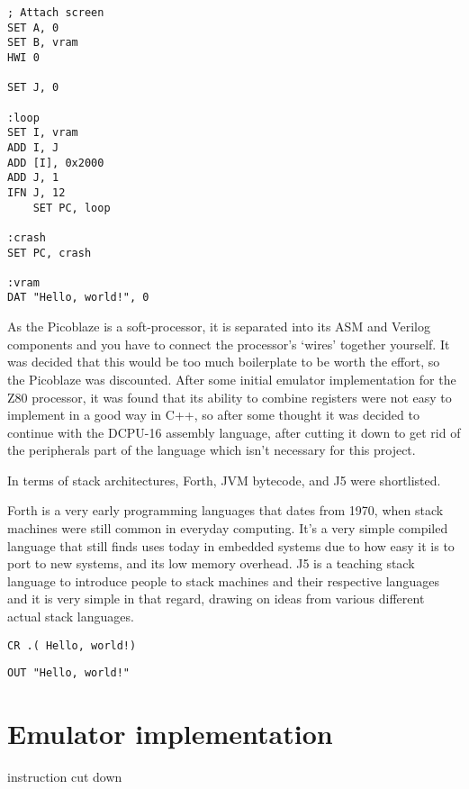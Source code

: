 \begin{lstlisting}[caption={DCPU-16 ASM},captionpos=b]
; Attach screen
SET A, 0
SET B, vram
HWI 0

SET J, 0

:loop
SET I, vram
ADD I, J
ADD [I], 0x2000
ADD J, 1
IFN J, 12
    SET PC, loop

:crash
SET PC, crash

:vram
DAT "Hello, world!", 0
\end{lstlisting}%

As the Picoblaze is a soft-processor, it is separated into its ASM and Verilog
components and you have to connect the processor's `wires' together yourself. It
was decided that this would be too much boilerplate to be worth the effort, so
the Picoblaze was discounted. After some initial emulator implementation for the
Z80 processor, it was found that its ability to combine registers were not easy
to implement in a good way in C++, so after some thought it was decided to
continue with the DCPU-16 assembly language, after cutting it down to get rid of
the peripherals part of the language which isn't necessary for this project.

In terms of stack architectures, Forth, JVM bytecode, and J5 were shortlisted.

Forth is a very early programming languages that dates from 1970, when stack
machines were still common in everyday computing. It's a very simple compiled
language that still finds uses today in embedded systems due to how easy it is
to port to new systems, and its low memory overhead. J5 is a teaching stack
language to introduce people to stack machines and their respective languages
and it is very simple in that regard, drawing on ideas from various different
actual stack languages.

\noindent\begin{minipage}{0.5\textwidth}
\begin{lstlisting}[caption={Forth ASM},captionpos=b]
CR .( Hello, world!)
\end{lstlisting}
\end{minipage}%
\noindent\begin{minipage}{0.5\textwidth}
\begin{lstlisting}[caption={J5 ASM},captionpos=b]
OUT "Hello, world!"
\end{lstlisting}
\end{minipage}

\section{Emulator implementation}

instruction cut down


